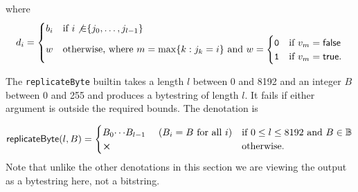 \noindent where
$$
  d_i =
  \begin{cases}
    b_i & \text{if $i \not{\in} \{j_0, \ldots, j_{l-1}\}$}\\
    w & \text{otherwise, where $m = \max\{k : j_k = i\}$ and }
      w=\begin{cases}
      \mathtt{0} & \text{if $v_m = \mathsf{false}$}\\
      \mathtt{1} & \text{if $v_m = \mathsf{true}$}.
    \end{cases}
  \end{cases}
$$


\label{note:replicateByte}
The \texttt{replicateByte} builtin takes a length $l$ between 0 and 8192 and an
integer $B$ between 0 and 255 and produces a bytestring of length $l$.  It fails
if either argument is outside the required bounds.  The denotation is

$$
\mathsf{replicateByte}(l,B) =
\begin{cases}
B_0{\cdots}B_{l-1} \quad\text{ ($B_i=B$ for all $i$}) & \text{if $0 \leq l \leq 8192$ and $B \in \B$}\\
\errorX      & \text{otherwise}.
\end{cases}
$$
\noindent Note that unlike the other denotations in this section we are
viewing the output as a bytestring here, not a bitstring.
